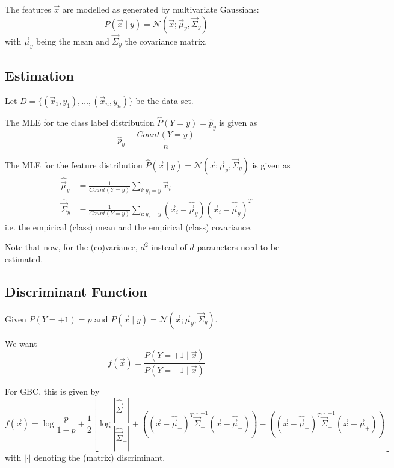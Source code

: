 The features $\vec{x}$ are modelled as
generated by multivariate Gaussians:
\begin{equation*}
P(\vec{x} \mid y)
= \mathcal{N}(\vec{x}; \vec{\mu}_y, \vec{\Sigma}_y)
\end{equation*}
with $\vec{\mu}_y$ being the mean and
$\vec{\Sigma}_y$ the covariance matrix.


\subsection{Estimation}
Let $D = \{(\vec{x}_1, y_1), \dotsc, (\vec{x}_n, y_n)\}$ be the data set.

The MLE for the class label distribution
$\hat{P}(Y = y) = \hat{p}_y$ is given as
\begin{equation*}
\hat{p}_y = \frac{Count(Y = y)}{n}
\end{equation*}

The MLE for the feature distribution
$\hat{P}(\vec{x} \mid y) = \mathcal{N}(\vec{x}; \vec{\mu}_y, \vec{\Sigma}_y)$
is given as
\begin{align*}
\hat{\vec{\mu}}_y
&= \frac{1}{Count(Y = y)}
\sum_{i : y_i = y}{\vec{x}_i} \\
\hat{\vec{\Sigma}}_y
&= \frac{1}{Count(Y = y)}
\sum_{i : y_i = y}{
	(\vec{x}_i - \hat{\vec{\mu}}_y)
	(\vec{x}_i - \hat{\vec{\mu}}_y)^T
}
\end{align*}
i.e. the empirical (class) mean and the
empirical (class) covariance.

Note that now, for the (co)variance,
$d^2$ instead of $d$ parameters need
to be estimated.


\subsection{Discriminant Function}
Given $P(Y = +1) = p$ and
$P(\vec{x} \mid y) = \mathcal{N}(\vec{x}; \vec{\mu}_y, \vec{\Sigma}_y)$.

We want
\begin{equation*}
f(\vec{x}) = \frac{
	P(Y = +1 \mid \vec{x})
}{
	P(Y = -1 \mid \vec{x})
}
\end{equation*}

For GBC, this is given by
\begin{equation*}
f(\vec{x}) =
\log{\frac{p}{1-p}} +
\frac{1}{2} \left[
\log{\frac{|\hat{\vec{\Sigma}}_-|}{|\hat{\vec{\Sigma}}_+|}}
+
\left(
(\vec{x}-\hat{\vec{\mu}}_-)^T
\hat{\vec{\Sigma}}_-^{-1}
(\vec{x}-\hat{\vec{\mu}}_-)
\right)
-
\left(
(\vec{x}-\hat{\vec{\mu}}_+)^T
\hat{\vec{\Sigma}}_+^{-1}
(\vec{x}-\hat{\vec{\mu}}_+)
\right)
\right]
\end{equation*}
with $|\cdot|$ denoting the (matrix)
discriminant.


